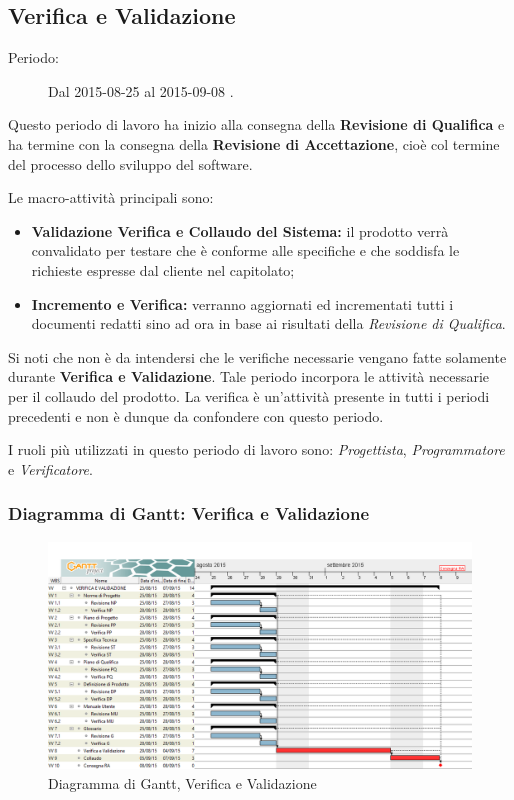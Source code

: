 \newpage
\subsection{Verifica e Validazione}
\begin{description}
	\item[Periodo:] Dal 2015-08-25 al 2015-09-08 .
\end{description}
Questo periodo di lavoro ha inizio alla consegna della \textbf{Revisione di Qualifica} e ha termine con la consegna della \textbf{Revisione di Accettazione}, cioè col termine del processo dello sviluppo del software.

\noindent Le macro-attività principali sono:
\begin{itemize}
	\item \textbf{Validazione Verifica e Collaudo del Sistema:} il prodotto verrà convalidato per testare che è conforme alle specifiche e che soddisfa le richieste espresse dal cliente nel capitolato;
	\item \textbf{Incremento e Verifica:} verranno aggiornati ed incrementati tutti i documenti redatti sino ad ora in base ai risultati della \textit{Revisione di Qualifica}.
\end{itemize}
Si noti che non è da intendersi che le verifiche necessarie vengano fatte solamente durante \textbf{Verifica e Validazione}. Tale periodo incorpora le attività necessarie per il collaudo del prodotto. La verifica è un'attività presente in tutti i periodi precedenti e non è dunque da confondere con questo periodo.

\noindent I ruoli più utilizzati in questo periodo di lavoro sono: \textit{Progettista}, \textit{Programmatore} e \textit{Verificatore}.
\subsubsection{Diagramma di Gantt: Verifica e Validazione}
\begin{figure}[h] 
	\centering
	\includegraphics[width=\textwidth]{./img/verifica_validazione.png}
	\caption{Diagramma di Gantt, Verifica e Validazione}
	\label{fig5}
\end{figure}

